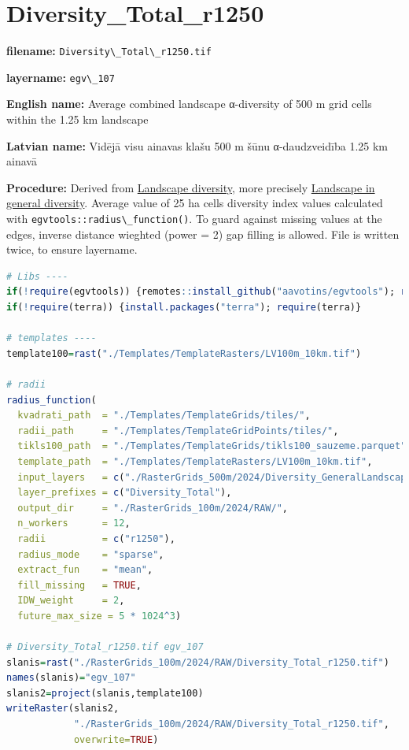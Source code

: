\documentclass[
]{book}
\newcommand{\passthrough}[1]{#1}
\begin{document}
\section{Diversity\_Total\_r1250}\label{ch06.107}

\textbf{filename:} \passthrough{\lstinline!Diversity\_Total\_r1250.tif!}

\textbf{layername:} \passthrough{\lstinline!egv\_107!}

\textbf{English name:} Average combined landscape α-diversity of 500 m grid cells within the 1.25 km landscape

\textbf{Latvian name:} Vidējā visu ainavas klašu 500 m šūnu α-daudzveidība 1.25 km ainavā

\textbf{Procedure:} Derived from \hyperref[Ch05.04]{Landscape diversity}, more precisely
\hyperref[Ch05.04.01]{Landscape in general diversity}. Average value of 25 ha
cells diversity index values calculated with \passthrough{\lstinline!egvtools::radius\_function()!}. To
guard against missing values at the edges, inverse distance wieghted (power = 2)
gap filling is allowed. File is written twice, to ensure layername.

\begin{lstlisting}[language=R]
# Libs ----
if(!require(egvtools)) {remotes::install_github("aavotins/egvtools"); require(egvtools)}
if(!require(terra)) {install.packages("terra"); require(terra)}

# templates ----
template100=rast("./Templates/TemplateRasters/LV100m_10km.tif")

# radii
radius_function(
  kvadrati_path  = "./Templates/TemplateGrids/tiles/",
  radii_path     = "./Templates/TemplateGridPoints/tiles/",
  tikls100_path  = "./Templates/TemplateGrids/tikls100_sauzeme.parquet",
  template_path  = "./Templates/TemplateRasters/LV100m_10km.tif",
  input_layers   = c("./RasterGrids_500m/2024/Diversity_GeneralLandscape_500x.tif"),
  layer_prefixes = c("Diversity_Total"),
  output_dir     = "./RasterGrids_100m/2024/RAW/",
  n_workers      = 12,
  radii          = c("r1250"),
  radius_mode    = "sparse",
  extract_fun    = "mean",
  fill_missing   = TRUE,
  IDW_weight     = 2,
  future_max_size = 5 * 1024^3)

# Diversity_Total_r1250.tif egv_107
slanis=rast("./RasterGrids_100m/2024/RAW/Diversity_Total_r1250.tif")
names(slanis)="egv_107"
slanis2=project(slanis,template100)
writeRaster(slanis2,
            "./RasterGrids_100m/2024/RAW/Diversity_Total_r1250.tif",
            overwrite=TRUE)
\end{lstlisting}
\end{document}

